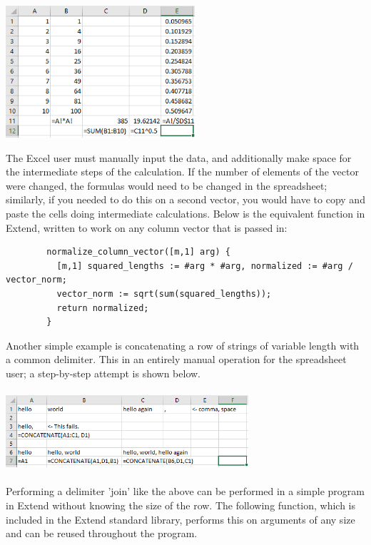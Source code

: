 	\begin{center}
	\includegraphics[width=7cm]{img/unitvector.png}
	\end{center}

	\medskip \noindent The Excel user must manually input the data, and additionally make space for the intermediate steps of the calculation. If the number of elements of the vector were changed, the formulas would need to be changed in the spreadsheet; similarly, if you needed to do this on a second vector, you would have to copy and paste the cells doing intermediate calculations. Below is the equivalent function in Extend, written to work on any column vector that is passed in:

	\begin{lstlisting}
		normalize_column_vector([m,1] arg) {
		  [m,1] squared_lengths := #arg * #arg, normalized := #arg / vector_norm;
		  vector_norm := sqrt(sum(squared_lengths));
		  return normalized;
		}
	\end{lstlisting}

	\medskip \noindent Another simple example is concatenating a row of strings of variable length with a common delimiter. This in an entirely manual operation for the spreadsheet user; a step-by-step attempt is shown below.

	\begin{center}
	\includegraphics[width=9cm,height=3cm]{img/concatenation.png}
	\end{center}

	\medskip \noindent Performing a delimiter 'join' like the above can be performed in a simple program in Extend without knowing the size of the row. The following function, which is included in the Extend standard library, performs this on arguments of any size and can be reused throughout the program.

